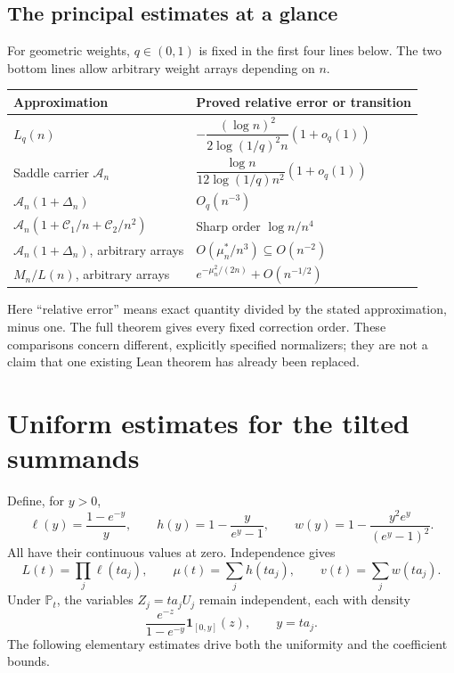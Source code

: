 \documentclass[11pt,a4paper]{article}
\numberwithin{equation}{section}
\theoremstyle{definition}\newtheorem{definition}[theorem]{Definition}
\theoremstyle{remark}\newtheorem{remark}[theorem]{Remark}
\newcommand{\Pp}{\mathbb P}
\newcommand{\Cj}{\mathscr C}
\newcommand{\A}{\mathcal A}
\begin{document}
\subsection{The principal estimates at a glance}
For geometric weights, $q\in(0,1)$ is fixed in the first four lines below. The two bottom lines allow arbitrary weight arrays depending on $n$.
\begin{center}
\small
\begin{tabular}{p{}p{}}
\toprule
Approximation & Proved relative error or transition \\
\midrule
$L_q(n)$ & $-\dfrac{(\log n)^2}{2\log(1/q)^2n}(1+o_q(1))$ \\[2mm]
Saddle carrier $\A_n$ & $\dfrac{\log n}{12\log(1/q)n^2}(1+o_q(1))$ \\[2mm]
$\A_n(1+\Delta_n)$ & $O_q(n^{-3})$ \\[1mm]
$\A_n(1+\Cj_1/n+\Cj_2/n^2)$ & Sharp order $\log n/n^4$ \\[1mm]
$\A_n(1+\Delta_n)$, arbitrary arrays & $O(\mu_n^*/n^3)\subseteq O(n^{-2})$ \\[1mm]
$M_n/L(n)$, arbitrary arrays & $e^{-\mu_n^2/(2n)}+O(n^{-1/2})$ \\
\bottomrule
\end{tabular}
\end{center}
Here ``relative error'' means exact quantity divided by the stated approximation, minus one. The full theorem gives every fixed correction order. These comparisons concern different, explicitly specified normalizers; they are not a claim that one existing Lean theorem has already been replaced.

\section{Uniform estimates for the tilted summands}
\label{sec:summands}
Define, for $y>0$,
\begin{equation}\label{eq:ellhv}
 \ell(y)=\frac{1-e^{-y}}{y},\qquad
 h(y)=1-\frac{y}{e^y-1},\qquad
 w(y)=1-\frac{y^2e^y}{(e^y-1)^2}.
\end{equation}
All have their continuous values at zero. Independence gives
\begin{equation}\label{eq:product}
 L(t)=\prod_j\ell(ta_j),\qquad
 \mu(t)=\sum_jh(ta_j),\qquad v(t)=\sum_jw(ta_j).
\end{equation}
Under $\Pp_t$, the variables $Z_j=ta_jU_j$ remain independent, each with density
\begin{equation}\label{eq:truncexp}
 \frac{e^{-z}}{1-e^{-y}}\boldsymbol1_{[0,y]}(z),\qquad y=ta_j.
\end{equation}
The following elementary estimates drive both the uniformity and the coefficient bounds.
\end{document}
